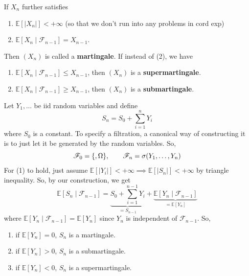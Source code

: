 	\begin{definition}[Martingale]
	  If $X_n$ further satisfies 
		\begin{enumerate}
			\item $\mathbb{E}[|X_n|] < +\infty$ (so that we don't run into any problems in cord exp)
			\item $\mathbb{E}[X_n \mid \mathscr{F}_{n-1}] = X_{n-1}$. 
		\end{enumerate}
		Then $(X_n)$ is called a \textbf{martingale}. If instead of (2), we have 
		\begin{enumerate}
		  \item $\mathbb{E}[X_n \mid \mathscr{F}_{n-1}] \leq X_{n-1}$, then $(X_n)$ is a \textbf{supermartingale}. 
		  \item $\mathbb{E}[X_n \mid \mathscr{F}_{n-1}] \geq X_{n-1}$, then $(X_n)$ is a \textbf{submartingale}. 
		\end{enumerate}
	\end{definition}

	\begin{example}
	  Let $Y_1, \ldots$ be iid random variables and define 
		\begin{equation}
			S_n = S_0 + \sum_{i=1}^n Y_i
		\end{equation}
		where $S_0$ is a constant. To specify a filtration, a canonical way of constructing it is to just let it be generated by the random variables. So, 
		\begin{equation}
			\mathscr{F}_0 = \{\empty,  \Omega\}, \qquad \mathscr{F}_n = \sigma(Y_1, \ldots, Y_n)
		\end{equation}
		For (1) to hold, just assume $\mathbb{E}[|Y_i|] < +\infty \implies \mathbb{E}[|S_n|] < +\infty$ by triangle inequality. So, by our construction, we get 
		\begin{equation}
			\mathbb{E}[S_n \mid \mathscr{F}_{n-1}] = \underbrace{S_0 + \sum_{i=1}^{n-1} Y_i}_{= S_{n-1}} + \underbrace{\mathbb{E}[Y_n \mid \mathscr{F}_{n-1}]}_{= \mathbb{E}[Y_n]} 
		\end{equation}
		where $\mathbb{E}[Y_n \mid \mathscr{F}_{n-1}] = \mathbb{E}[Y_n]$ since $Y_n$ is independent of $\mathscr{F}_{n-1}$. So, 
		\begin{enumerate}
			\item if $\mathbb{E}[Y_n] = 0$, $S_n$ is a martingale. 
			\item if $\mathbb{E}[Y_n] > 0$, $S_n$ is a submartingale. 
			\item if $\mathbb{E}[Y_n] < 0$, $S_n$ is a supermartingale. 
		\end{enumerate}
	\end{example}

